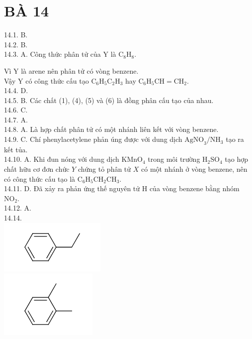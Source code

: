 \documentclass[10pt]{article}
\begin{document}
\section*{BÀ 14}
14.1. B.\\
14.2. B.\\
14.3. A. Công thức phân tử của Y là $\mathrm{C}_{8} \mathrm{H}_{8}$.

Vì Y là arene nên phân tử có vòng benzene.\\
Vậy Y có công thức cấu tạo $\mathrm{C}_{6} \mathrm{H}_{5} \mathrm{C}_{2} \mathrm{H}_{3}$ hay $\mathrm{C}_{6} \mathrm{H}_{5} \mathrm{CH}=\mathrm{CH}_{2}$.\\
14.4. D.\\
14.5. B. Các chất (1), (4), (5) và (6) là đồng phân cấu tạo của nhau.\\
14.6. C.\\
14.7. A.\\
14.8. A. Là hợp chất phân tử có một nhánh liên kết với vòng benzene.\\
14.9. C. Chí phenylacetylene phản úng được với dung dịch $\mathrm{AgNO}_{3} / \mathrm{NH}_{3}$ tạo ra kết tủa.\\
14.10. A. Khi đun nóng với dung dịch $\mathrm{KMnO}_{4}$ trong môi trường $\mathrm{H}_{2} \mathrm{SO}_{4}$ tạo hợp chất hữu cơ đơn chức $Y$ chứng tỏ phân tử $X$ có một nhánh ở vòng benzene, nên có công thức cấu tạo là $\mathrm{C}_{6} \mathrm{H}_{5} \mathrm{CH}_{2} \mathrm{CH}_{3}$.\\
14.11. D. Đã xảy ra phản ứng thế nguyên tử H của vòng benzene bằng nhóm $\mathrm{NO}_{2}$.\\
14.12. A.\\
14.14.\\
\includegraphics{smile-9d26afc9e977b2dc09be45dae9a19814d59a97b3}\\
\includegraphics{smile-1ec89c6a500ab8ff5c996972cd16e5b23d040578}\\
\end{document}
